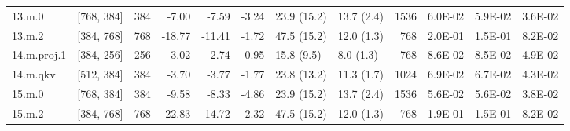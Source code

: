 \begin{table}
\begin{tabular}{llrrrrllrrrr}
13.m.0 & [768, 384] & 384 & {\cellcolor[HTML]{FDFEBC}} \color[HTML]{000000} -7.00 & {\cellcolor[HTML]{FEFFBE}} \color[HTML]{000000} -7.59 & {\cellcolor[HTML]{F2FAAE}} \color[HTML]{000000} -3.24 & 23.9 (15.2) & 13.7 (2.4) & 1536 & {\cellcolor[HTML]{FFFBB8}} \color[HTML]{000000} 6.0E-02 & {\cellcolor[HTML]{FFFBB8}} \color[HTML]{000000} 5.9E-02 & {\cellcolor[HTML]{E6F59D}} \color[HTML]{000000} 3.6E-02 \\
13.m.2 & [384, 768] & 768 & {\cellcolor[HTML]{FEE695}} \color[HTML]{000000} -18.77 & {\cellcolor[HTML]{FFF7B2}} \color[HTML]{000000} -11.41 & {\cellcolor[HTML]{EEF8A8}} \color[HTML]{000000} -1.72 & 47.5 (15.2) & 12.0 (1.3) & 768 & {\cellcolor[HTML]{A50026}} \color[HTML]{F1F1F1} 2.0E-01 & {\cellcolor[HTML]{E95538}} \color[HTML]{F1F1F1} 1.5E-01 & {\cellcolor[HTML]{FEE491}} \color[HTML]{000000} 8.2E-02 \\
14.m.proj.1 & [384, 256] & 256 & {\cellcolor[HTML]{F2FAAE}} \color[HTML]{000000} -3.02 & {\cellcolor[HTML]{F1F9AC}} \color[HTML]{000000} -2.74 & {\cellcolor[HTML]{ECF7A6}} \color[HTML]{000000} -0.95 & 15.8 (9.5) & 8.0 (1.3) & 768 & {\cellcolor[HTML]{FEDE89}} \color[HTML]{000000} 8.6E-02 & {\cellcolor[HTML]{FEE08B}} \color[HTML]{000000} 8.5E-02 & {\cellcolor[HTML]{F7FCB4}} \color[HTML]{000000} 4.9E-02 \\
14.m.qkv & [512, 384] & 384 & {\cellcolor[HTML]{F4FAB0}} \color[HTML]{000000} -3.70 & {\cellcolor[HTML]{F4FAB0}} \color[HTML]{000000} -3.77 & {\cellcolor[HTML]{EEF8A8}} \color[HTML]{000000} -1.77 & 23.8 (13.2) & 11.3 (1.7) & 1024 & {\cellcolor[HTML]{FFF1A8}} \color[HTML]{000000} 6.9E-02 & {\cellcolor[HTML]{FFF2AA}} \color[HTML]{000000} 6.7E-02 & {\cellcolor[HTML]{EEF8A8}} \color[HTML]{000000} 4.3E-02 \\
15.m.0 & [768, 384] & 384 & {\cellcolor[HTML]{FFFBB8}} \color[HTML]{000000} -9.58 & {\cellcolor[HTML]{FFFDBC}} \color[HTML]{000000} -8.33 & {\cellcolor[HTML]{F7FCB4}} \color[HTML]{000000} -4.86 & 23.9 (15.2) & 13.7 (2.4) & 1536 & {\cellcolor[HTML]{FFFEBE}} \color[HTML]{000000} 5.6E-02 & {\cellcolor[HTML]{FFFEBE}} \color[HTML]{000000} 5.6E-02 & {\cellcolor[HTML]{E8F59F}} \color[HTML]{000000} 3.8E-02 \\
15.m.2 & [384, 768] & 768 & {\cellcolor[HTML]{FEDA86}} \color[HTML]{000000} -22.83 & {\cellcolor[HTML]{FEEFA3}} \color[HTML]{000000} -14.72 & {\cellcolor[HTML]{EFF8AA}} \color[HTML]{000000} -2.32 & 47.5 (15.2) & 12.0 (1.3) & 768 & {\cellcolor[HTML]{C01A27}} \color[HTML]{F1F1F1} 1.9E-01 & {\cellcolor[HTML]{EC5C3B}} \color[HTML]{F1F1F1} 1.5E-01 & {\cellcolor[HTML]{FEE491}} \color[HTML]{000000} 8.2E-02 \\

\end{tabular}
\end{table}
